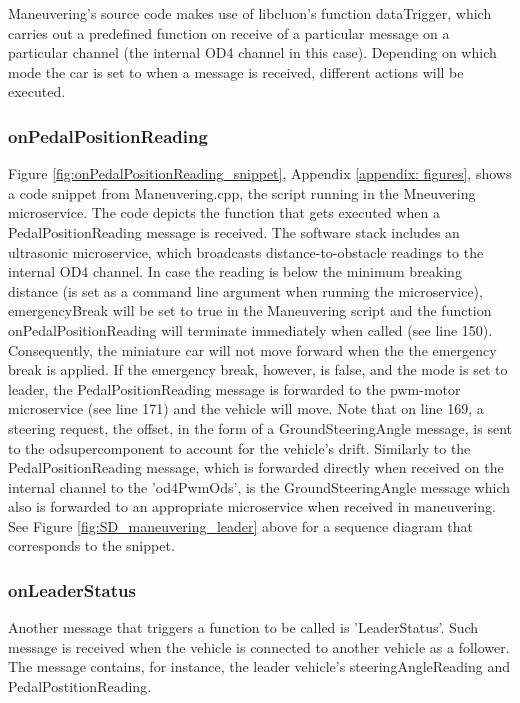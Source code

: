 \documentclass[12pt]{article}
\begin{document}
Maneuvering's source code makes use of libcluon's function dataTrigger, which carries out a predefined function on receive of a particular message on a particular channel (the internal OD4 channel in this case). Depending on which mode the car is set to when a message is received, different actions will be executed.

\subsubsection{onPedalPositionReading}
Figure \ref{fig:onPedalPositionReading_snippet}, Appendix \ref{appendix: figures}, shows a code snippet from Maneuvering.cpp, the script running in the Mneuvering microservice. The code depicts the function that gets executed when a PedalPositionReading message is received. The software stack includes an ultrasonic microservice, which broadcasts distance-to-obstacle readings to the internal OD4 channel. In case the reading is below the minimum breaking distance (is set as a command line argument when running the microservice), emergencyBreak will be set to true in the Maneuvering script and the function onPedalPositionReading will terminate immediately when called (see line 150). Consequently, the miniature car will not move forward when the the emergency break is applied. If the emergency break, however, is false, and the mode is set to leader, the PedalPositionReading message is forwarded to the pwm-motor microservice (see line 171) and the vehicle will move. Note that on line 169, a steering request, the offset, in the form of a GroundSteeringAngle message, is sent to the odsupercomponent to account for the vehicle's drift. Similarly to the PedalPositionReading message, which is forwarded directly when received on the internal channel to the 'od4PwmOds', is the GroundSteeringAngle message which also is forwarded to an appropriate microservice when received in maneuvering. See Figure \ref{fig:SD_maneuvering_leader} above for a sequence diagram that corresponds to the snippet.

\subsubsection{onLeaderStatus} \label{onLeaderStatus}
Another message that triggers a function to be called is 'LeaderStatus'. Such message is received when the vehicle is connected to another vehicle as a follower. The message contains, for instance, the leader vehicle's steeringAngleReading and PedalPostitionReading.
\end{document}

